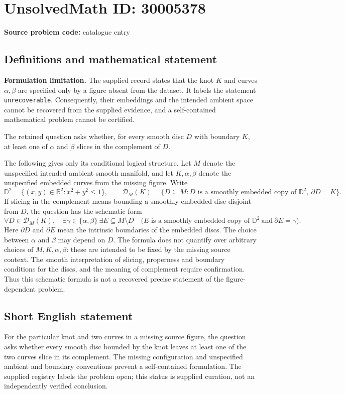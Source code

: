 \documentclass[11pt]{article}
\newcommand{\R}{\mathbb{R}}
\begin{document}
\section*{UnsolvedMath ID: 30005378}
\textbf{Source problem code:} catalogue entry
\subsection{Definitions and mathematical statement}
\textbf{Formulation limitation.} The supplied record states that the knot \(K\) and curves \(\alpha,\beta\) are specified only by a figure absent from the dataset. It labels the statement \texttt{unrecoverable}. Consequently, their embeddings and the intended ambient space cannot be recovered from the supplied evidence, and a self-contained mathematical problem cannot be certified.

The retained question asks whether, for every smooth disc \(D\) with boundary \(K\), at least one of \(\alpha\) and \(\beta\) slices in the complement of \(D\).

The following gives only its conditional logical structure. Let \(M\) denote the unspecified intended ambient smooth manifold, and let \(K,\alpha,\beta\) denote the unspecified embedded curves from the missing figure. Write
\[
\mathbb D^2=\{(x,y)\in\R^2:x^2+y^2\leq 1\},
\qquad
\mathcal D_M(K)=\{D\subseteq M:D\text{ is a smoothly embedded copy of }\mathbb D^2,\ \partial D=K\}.
\]
If slicing in the complement means bounding a smoothly embedded disc disjoint from \(D\), the question has the schematic form
\[
\forall D\in\mathcal D_M(K),\quad
\exists\gamma\in\{\alpha,\beta\}\ \exists E\subseteq M\setminus D
\quad
\bigl(E\text{ is a smoothly embedded copy of }\mathbb D^2\ \text{and}\ \partial E=\gamma\bigr).
\]
Here \(\partial D\) and \(\partial E\) mean the intrinsic boundaries of the embedded discs. The choice between \(\alpha\) and \(\beta\) may depend on \(D\). The formula does not quantify over arbitrary choices of \(M,K,\alpha,\beta\): these are intended to be fixed by the missing source context. The smooth interpretation of slicing, properness and boundary conditions for the discs, and the meaning of complement require confirmation. Thus this schematic formula is not a recovered precise statement of the figure-dependent problem.
\subsection{Short English statement}
For the particular knot and two curves in a missing source figure, the question asks whether every smooth disc bounded by the knot leaves at least one of the two curves slice in its complement. The missing configuration and unspecified ambient and boundary conventions prevent a self-contained formulation. The supplied registry labels the problem open; this status is supplied curation, not an independently verified conclusion.
\end{document}
